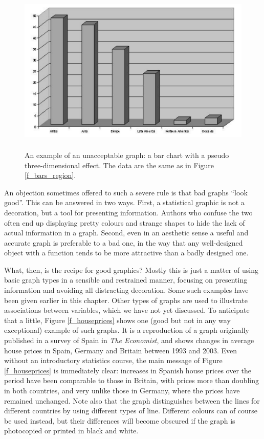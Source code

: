 \begin{figure}
\caption{An example of an unacceptable graph: a bar chart with a pseudo
three-dimensional effect. The data are the same as in Figure
\ref{f_bars_region}.}
\label{f_yuk}
\begin{center}
\includegraphics[height=8cm]{threeD}
\end{center}
\end{figure}

An objection sometimes offered to such a severe rule is that bad graphs
``look good''. This can be answered in two ways. First, a statistical
graphic is not a decoration, but a tool for presenting information.
Authors who confuse the two often end up displaying pretty colours and
strange shapes to hide the lack of actual information in a graph.
Second, even in an aesthetic sense a useful and accurate graph is
preferable to a bad one, in the way that any well-designed object with a
function tends to be more attractive than a badly designed one.

What, then, is the recipe for good graphics? Mostly this is just a
matter of using basic graph types in a sensible and restrained manner,
focusing on presenting information and avoiding all distracting
decoration. Some such examples have been given earlier in this chapter.
Other types of graphs are used to illustrate associations between
variables, which we have not yet discussed. To anticipate that a little,
Figure \ref{f_houseprices} shows one (good but not in any way
exceptional) example of such graphs. It is a reproduction of a graph
originally published in a survey of Spain in \emph{The Economist}, and
shows changes in average house prices in Spain, Germany and Britain between 1993
and 2003. Even without an introductory statistics course,
the main message of Figure \ref{f_houseprices} is immediately clear: increases in
Spanish house prices over the period have been comparable to those in
Britain, with prices more than doubling in both countries, and very
unlike those in Germany, where the prices have remained unchanged. Note
also that the graph distinguishes between the lines for different
countries by using different types of line. Different colours can of
course be used instead, but their differences will become obscured if
the graph is photocopied or printed in black and white.

